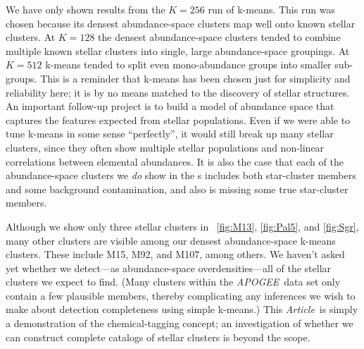 \documentclass[12pt, letterpaper, preprint]{aastex}
\newcommand{\acronym}[1]{{\small{#1}}}
\newcommand{\project}[1]{\textsl{#1}}
\newcommand{\apogee}{\project{\acronym{APOGEE}}}
\newcommand{\documentname}{\textsl{Article}}
\begin{document}
We have only shown results from the $K=256$ run of k-means.
This run was chosen because its densest abundance-space clusters map
well onto known stellar clusters.
At $K=128$ the densest abundance-space clusters tended to combine
multiple known stellar clusters into single, large abundance-space
groupings.
At $K=512$ k-means tended to split even mono-abundance groups into
smaller sub-groups.
This is a reminder that k-means has been chosen just for simplicity
and reliability here; it is by no means matched to the discovery of
stellar structures.
An important follow-up project is to build a model of abundance space
that captures the features expected from stellar populations.
Even if we were able to tune k-means in some sense ``perfectly'', it
would still break up many stellar clusters, since they often show
multiple stellar populations and non-linear correlations between elemental abundances.
It is also the case that each of the abundance-space clusters we
\emph{do} show in the \figurename s includes both star-cluster members
and some background contamination, and also is missing some true
star-cluster members.

Although we show only three stellar clusters in
\figurename~\ref{fig:M13}, \ref{fig:Pal5}, and \ref{fig:Sgr}, many
other clusters are visible among our densest abundance-space k-means
clusters.
These include M15, M92, and M107, among others.
We haven't asked yet whether we detect---as abundance-space
overdensities---all of the stellar clusters we expect to find. (Many
clusters within the \apogee\ data set only contain a few plausible 
members, thereby  complicating any inferences we wish to make about 
detection completeness using simple k-means.) 
This \documentname\ is simply a demonstration of the chemical-tagging
concept; an investigation of whether we can construct complete
catalogs of stellar clusters is beyond the scope.
\end{document}
